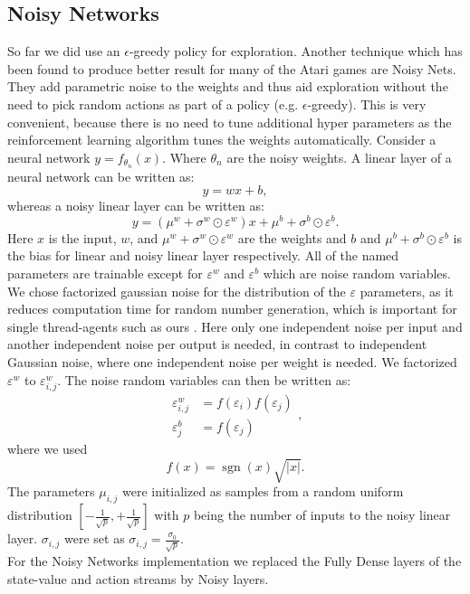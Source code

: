 \documentclass[12pt]{article}
\begin{document}
\subsection{Noisy Networks}
So far we did use an $\epsilon$-greedy policy for exploration. Another technique which has been found to produce better result for many of the Atari games are Noisy Nets. They add parametric noise to the weights and thus aid exploration without the need to pick random actions as part of a policy (e.g. $\epsilon$-greedy). This is very convenient, because there is no need to tune additional hyper parameters as the reinforcement learning algorithm tunes the weights automatically.
Consider a neural network $y=f_{\theta_n}(x)$. Where $\theta_n$ are the noisy weights. A linear layer of a neural network can be written as: 
\begin{equation}
y = w x+b,
\end{equation}
whereas a noisy linear layer can be written as:
\begin{equation}
y =\left(\mu^{w}+\sigma^{w} \odot \varepsilon^{w}\right) x+\mu^{b}+\sigma^{b} \odot \varepsilon^{b}.
\end{equation}
Here $x$ is the input, $w$, and $\mu^{w}+\sigma^{w} \odot \varepsilon^{w}$ are the weights and $b$ and $\mu^{b}+\sigma^{b} \odot \varepsilon^{b}$ is the bias for linear and noisy linear layer respectively. All of the named parameters are trainable except for $\varepsilon^w$ and $\varepsilon^b$ which are noise random variables. We chose factorized gaussian noise for the distribution of the $\varepsilon$ parameters, as it reduces computation time for random number generation, which is important for single thread-agents such as ours \cite{DBLP:journals/corr/FortunatoAPMOGM17}. Here only one independent noise per input and another independent noise per output is needed, in contrast to independent Gaussian noise, where one independent noise per weight is needed.
We factorized $\varepsilon^w$ to $\varepsilon^w_{i,j}$.
The noise random variables can then be written as:
\begin{equation}
\begin{aligned} \varepsilon_{i, j}^{w} &=f\left(\varepsilon_{i}\right) f\left(\varepsilon_{j}\right) \\ \varepsilon_{j}^{b} &=f\left(\varepsilon_{j}\right) \end{aligned},
\end{equation}
where we used \begin{equation}
f(x)=\operatorname{sgn}(x) \sqrt{|x|}.
\end{equation}
The parameters $\mu_{i,j}$ were initialized as samples from a random uniform distribution $\left[-\frac{1}{\sqrt{p}},+\frac{1}{\sqrt{p}}\right]$ with $p$ being the number of inputs to the noisy linear layer. $\sigma_{i, j}$ were set as $\sigma_{i, j}=\frac{\sigma_{0}}{\sqrt{p}}$. \\
For the Noisy Networks implementation we replaced the Fully Dense layers of the state-value and action streams by Noisy layers. %
\cite{DBLP:journals/corr/FortunatoAPMOGM17}
\end{document}

